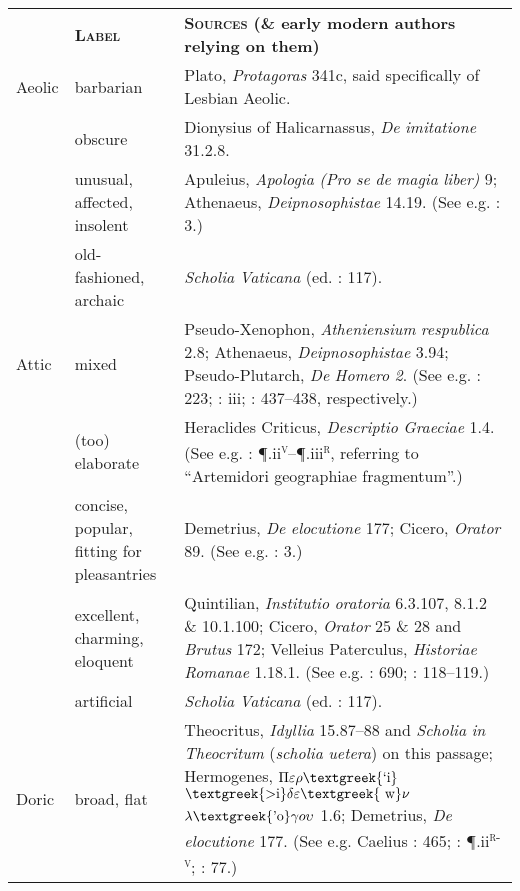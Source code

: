\documentclass[output=paper]{langsci/langscibook}
\begin{document}
\tabletail{}
\tablelasttail{}
\begin{tabularx}{\textwidth}{XXX}
\lsptoprule

\multicolumn{1}{X}{\textbf{\textsc{Dialect}}} & \textbf{\textsc{Label}} & \textbf{\textsc{Sources} \textbf{(\&} \textbf{early} \textbf{modern} \textbf{authors} \textbf{relying} \textbf{on} \textbf{them)}}\\
\multicolumn{1}{X}{Aeolic} & barbarian & Plato, \textit{Protagoras} 341c, said specifically of Lesbian Aeolic.\\
& obscure & Dionysius of Halicarnassus, \textit{De} \textit{imitatione} 31.2.8.\\
\hhline{~--} & unusual, affected, insolent & Apuleius, \textit{Apologia} \textit{(Pro} \textit{se} \textit{de} \textit{magia} \textit{liber)} 9; Athenaeus, \textit{Deipnosophistae} 14.19. (See e.g. \citealt{MuntheHeiberg1748}: 3.)\\
\hhline{~--} & old-fashioned, archaic & \textit{Scholia} \textit{Vaticana} (ed. \citealt{Hilgard1901}: 117).\\
\multicolumn{1}{X}{Attic} & mixed & Pseudo-Xenophon, \textit{Atheniensium} \textit{respublica} 2.8; Athenaeus, \textit{Deipnosophistae} 3.94; Pseudo-Plutarch, \textit{De} \textit{Homero} \textit{2}. (See e.g. \citealt{Schwartz1721}: 223; \citealt{Maittaire1706}: iii; \citealt{Saumaise1643a}: 437–438, respectively.)\\
& (too) elaborate & Heraclides Criticus, \textit{Descriptio} \textit{Graeciae} 1.4. (See e.g. \citealt{Estienne1573}: ¶.ii\textsc{\textsuperscript{v}}–¶.iii\textsc{\textsuperscript{r}}, referring to “Artemidori geographiae fragmentum”.)\\
\hhline{~--} & concise, popular, fitting for pleasantries & Demetrius, \textit{De} \textit{elocutione} 177; Cicero, \textit{Orator} 89. (See e.g. \citealt{MuntheHeiberg1748}: 3.)\\
\hhline{~--} & excellent, charming, eloquent & Quintilian, \textit{Institutio} \textit{oratoria} 6.3.107, 8.1.2 \& 10.1.100; Cicero, \textit{Orator} 25 \& 28 and \textit{Brutus} 172; Velleius Paterculus, \textit{Historiae} \textit{Romanae} 1.18.1. (See e.g. \citealt{Duret1613}: 690; \citealt{Rollin1726}: 118–119.)\\
\hhline{~--} & artificial & \textit{Scholia} \textit{Vaticana} (ed. \citealt{Hilgard1901}: 117).\\
\multicolumn{1}{X}{Doric} & broad, flat & Theocritus, \textit{Idyllia} 15.87–88 and \textit{Scholia} \textit{in} \textit{Theocritum} (\textit{scholia} \textit{uetera}) on this passage; Hermogenes, $\Pi \varepsilon \rho \text{\textgreek{`i}}$ $\text{\textgreek{>i}}\delta \varepsilon \text{\textgreek{~w}}\nu $ $\lambda \text{\textgreek{'o}}\gamma o\upsilon $ 1.6; Demetrius, \textit{De} \textit{elocutione} 177. (See e.g. Caelius \citealt{Rhodiginus1542}: 465; \citealt{Estienne1573}: ¶.ii\textsc{\textsuperscript{r-v}}; \citealt{Saumaise1643a}: 77.)\\

\end{tabularx}
\end{document}
